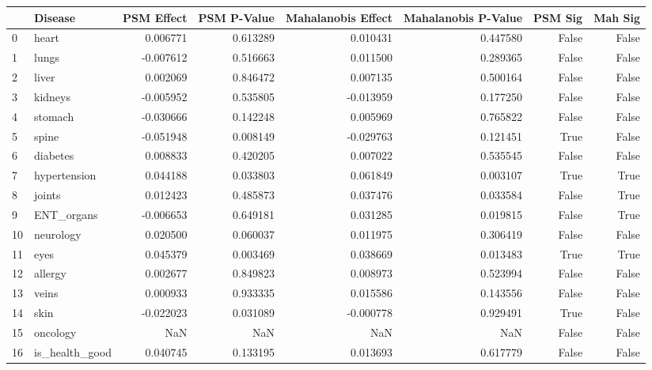 \begin{tabular}{llrrrrrr}
\toprule
 & Disease & PSM Effect & PSM P-Value & Mahalanobis Effect & Mahalanobis P-Value & PSM Sig & Mah Sig \\
\midrule
0 & heart & 0.006771 & 0.613289 & 0.010431 & 0.447580 & False & False \\
1 & lungs & -0.007612 & 0.516663 & 0.011500 & 0.289365 & False & False \\
2 & liver & 0.002069 & 0.846472 & 0.007135 & 0.500164 & False & False \\
3 & kidneys & -0.005952 & 0.535805 & -0.013959 & 0.177250 & False & False \\
4 & stomach & -0.030666 & 0.142248 & 0.005969 & 0.765822 & False & False \\
5 & spine & -0.051948 & 0.008149 & -0.029763 & 0.121451 & True & False \\
6 & diabetes & 0.008833 & 0.420205 & 0.007022 & 0.535545 & False & False \\
7 & hypertension & 0.044188 & 0.033803 & 0.061849 & 0.003107 & True & True \\
8 & joints & 0.012423 & 0.485873 & 0.037476 & 0.033584 & False & True \\
9 & ENT_organs & -0.006653 & 0.649181 & 0.031285 & 0.019815 & False & True \\
10 & neurology & 0.020500 & 0.060037 & 0.011975 & 0.306419 & False & False \\
11 & eyes & 0.045379 & 0.003469 & 0.038669 & 0.013483 & True & True \\
12 & allergy & 0.002677 & 0.849823 & 0.008973 & 0.523994 & False & False \\
13 & veins & 0.000933 & 0.933335 & 0.015586 & 0.143556 & False & False \\
14 & skin & -0.022023 & 0.031089 & -0.000778 & 0.929491 & True & False \\
15 & oncology & NaN & NaN & NaN & NaN & False & False \\
16 & is_health_good & 0.040745 & 0.133195 & 0.013693 & 0.617779 & False & False \\
\bottomrule
\end{tabular}
